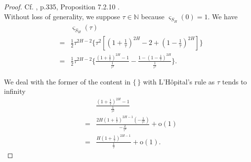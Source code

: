 \documentclass[a4paper, twoside, 11pt]{article}
\theoremstyle{definition}
\newcommand{\brkt}[1]{\left({#1} \right)}
\begin{document}
	\begin{proof}
	  Cf. \cite{nourdin}, p.335, Proposition 7.2.10 .\\
	  Without loss of generality, we suppose $\tau \in \mathbb{N}$ because $\varsigma_{S_H}(0)=1$. We have
	  \begin{eqnarray*}
		&&\varsigma_{S_H}(\tau) \\
	  &=& \frac{1}{2} \tau^{2H-2}\{ \tau^2[(1+\frac{1}{\tau})^{2H} - 2 + (1-\frac{1}{\tau})^{2H}] \} \\
	  &=& \frac{1}{2} \tau^{2H-2}\{ \frac{(1+\frac{1}{\tau})^{2H} - 1 } {\frac{1}{\tau^2}} -  \frac{1 - (1-\frac{1}{\tau})^{2H}} {\frac{1}{\tau^2}} \}.
	\end{eqnarray*}

	We deal with the former of the content in $\{\,\}$ with L'H\^opital's rule as $\tau$ tends to infinity
	\begin{eqnarray*}
	  &&\frac{(1+\frac{1}{\tau})^{2H} - 1 } {\frac{1}{\tau^2}} \\
	&=& \frac{2H(1+\frac{1}{\tau})^{2H-1}(-\frac{1}{\tau^2})}{-\frac{2}{\tau^3}} + \mathrm{o}(1)\\
	&=& \frac{H(1+\frac{1}{\tau})^{2H-1}}{\frac{1}{\tau}} + \mathrm{o}(1).
	\end{eqnarray*}


\end{proof}
\end{document}
